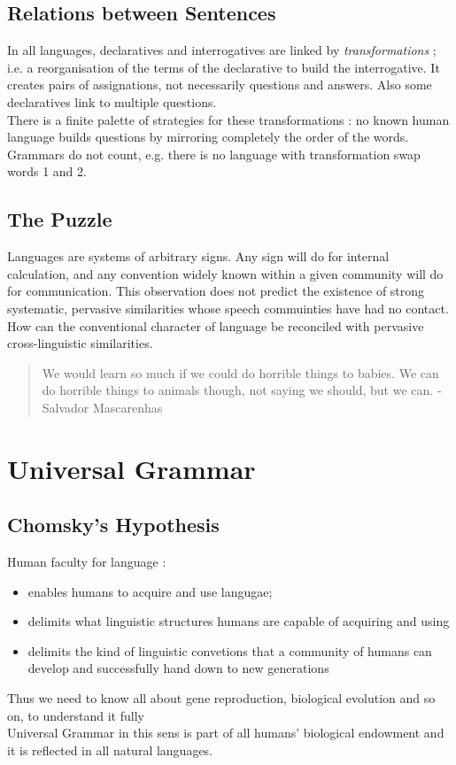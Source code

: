 \documentclass{cours}
\begin{document}
\subsection{Relations between Sentences}
In all languages, declaratives and interrogatives are linked by \emph{transformations} ; i.e. a reorganisation of the terms of the declarative to build the interrogative. It creates pairs of assignations, not necessarily questions and answers. Also some declaratives link to multiple questions. \\
There is a finite palette of strategies for these transformations : no known human language builds questions by mirroring completely the order of the words. Grammars do not count, e.g. there is no language with transformation swap words 1 and 2.\\

\subsection{The Puzzle}
Languages are systems of arbitrary signs. Any sign will do for internal calculation, and any convention widely known within a given community will do for communication. This observation does not predict the existence of strong systematic, pervasive similarities whose speech commuinties have had no contact. \\
How can the conventional character of language be reconciled with pervasive cross-linguistic similarities. 
\begin{quote}
    We would learn so much if we could do horrible things to babies. We can do horrible things to animals though, not saying we should, but we can.   - Salvador Mascarenhas
\end{quote}

\section{Universal Grammar}
\subsection{Chomsky's Hypothesis}
Human faculty for language : \begin{itemize}
    \item enables humans to acquire and use langugae;
    \item delimits what linguistic structures humans are capable of acquiring and using
    \item delimits the kind of linguistic convetions that a community of humans can develop and successfully hand down to new generations
\end{itemize}
Thus we need to know all about gene reproduction, biological evolution and so on, to understand it fully \\
Universal Grammar in this sens is part of all humans' biological endowment and it is reflected in all natural languages.
\end{document}
